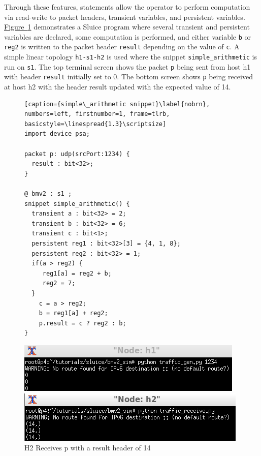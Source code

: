 \documentclass[12pt, oneside]{article}
\newcommand{\irref}[2]{\hyperref[#2]{#1~\ref{#2}}}
\begin{document}
Through these features, statements allow the operator to perform computation via read-write to packet headers, transient variables, and persistent variables. \irref{Figure}{arith} demonstrates a Sluice program where several transient and persistent variables are declared, some computation is performed, and either variable \texttt{b} or \texttt{reg2} is written to the packet header \texttt{result} depending on the value of \texttt{c}. A simple linear topology \texttt{h1-s1-h2} is used where the snippet \texttt{simple\_arithmetic} is run on \texttt{s1}. The top terminal screen shows the packet \texttt{p} being sent from host h1 with header \texttt{result} initially set to 0. The bottom screen shows \texttt{p} being received at host h2 with the header result updated with the expected value of 14.

\begin{figure}
\caption{Simple Arithmetic Example}\label{arith}
\captionsetup{justification=centering, font=footnotesize,labelfont=footnotesize}
\begin{minipage}{.46\textwidth} 
\begin{lstlisting}[caption={simple\_arithmetic snippet}\label{nobrn}, numbers=left, firstnumber=1, frame=tlrb, basicstyle=\linespread{1.3}\scriptsize]
import device psa;

packet p: udp(srcPort:1234) {
  result : bit<32>;
}

@ bmv2 : s1 ;
snippet simple_arithmetic() {
  transient a : bit<32> = 2;
  transient b : bit<32> = 6;
  transient c : bit<1>;
  persistent reg1 : bit<32>[3] = {4, 1, 8};
  persistent reg2 : bit<32> = 1;
  if(a > reg2) {
     reg1[a] = reg2 + b;
     reg2 = 7;
  }
    c = a > reg2;
    b = reg1[a] + reg2;
    p.result = c ? reg2 : b;
}
\end{lstlisting}
\end{minipage}
\qquad
\begin{minipage}{0.45\textwidth} 
\includegraphics[scale=.6]{figures/arith_ex_1} 
\caption*{H1 sends packet p with result initialized to 0\newline}

\includegraphics[scale=.6]{figures/arith_ex_2}
\caption*{H2 Receives p with a result header of 14}
\end{minipage}
\end{figure}
\end{document}
